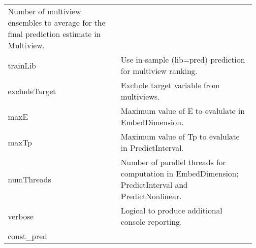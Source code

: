 \documentclass[]{article}
\begin{document}
\begin{longtable}[]{@{}ll@{}}
\begin{minipage}[t]{0.85\columnwidth}
Number of multiview ensembles to average for the final prediction
estimate in Multiview.\strut
\end{minipage}\tabularnewline
\begin{minipage}[t]{0.09\columnwidth}\raggedright
trainLib\strut
\end{minipage} & \begin{minipage}[t]{0.85\columnwidth}\raggedright
Use in-sample (lib=pred) prediction for multiview ranking.\strut
\end{minipage}\tabularnewline
\begin{minipage}[t]{0.09\columnwidth}\raggedright
excludeTarget\strut
\end{minipage} & \begin{minipage}[t]{0.85\columnwidth}\raggedright
Exclude target variable from multiviews.\strut
\end{minipage}\tabularnewline
\begin{minipage}[t]{0.09\columnwidth}\raggedright
maxE\strut
\end{minipage} & \begin{minipage}[t]{0.85\columnwidth}\raggedright
Maximum value of E to evalulate in EmbedDimension.\strut
\end{minipage}\tabularnewline
\begin{minipage}[t]{0.09\columnwidth}\raggedright
maxTp\strut
\end{minipage} & \begin{minipage}[t]{0.85\columnwidth}\raggedright
Maximum value of Tp to evalulate in PredictInterval.\strut
\end{minipage}\tabularnewline
\begin{minipage}[t]{0.09\columnwidth}\raggedright
numThreads\strut
\end{minipage} & \begin{minipage}[t]{0.85\columnwidth}\raggedright
Number of parallel threads for computation in EmbedDimension;
PredictInterval and PredictNonlinear.\strut
\end{minipage}\tabularnewline
\begin{minipage}[t]{0.09\columnwidth}\raggedright
verbose\strut
\end{minipage} & \begin{minipage}[t]{0.85\columnwidth}\raggedright
Logical to produce additional console reporting.\strut
\end{minipage}\tabularnewline
\begin{minipage}[t]{0.09\columnwidth}\raggedright
const\_pred\strut
\end{minipage} & \begin{minipage}[t]{0.85\columnwidth}\raggedright

\end{minipage}
\end{longtable}
\end{document}
